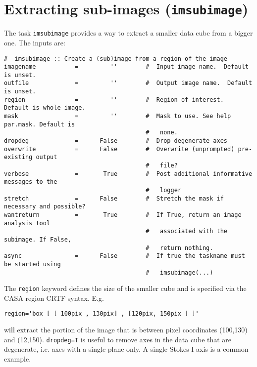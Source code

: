 \section{Extracting sub-images ({\tt imsubimage})}
\label{section:analysis.imsubimage}

The task {\tt imsubimage} provides a way to extract a smaller data
cube from a bigger one. The inputs are: 

\small
\begin{verbatim}
#  imsubimage :: Create a (sub)image from a region of the image
imagename           =         ''        #  Input image name.  Default is unset.
outfile             =         ''        #  Output image name.  Default is unset.
region              =         ''        #  Region of interest.  Default is whole image.
mask                =         ''        #  Mask to use. See help par.mask. Default is
                                        #   none.
dropdeg             =      False        #  Drop degenerate axes
overwrite           =      False        #  Overwrite (unprompted) pre-existing output
                                        #   file?
verbose             =       True        #  Post additional informative messages to the
                                        #   logger
stretch             =      False        #  Stretch the mask if necessary and possible?
wantreturn          =       True        #  If True, return an image analysis tool
                                        #   associated with the subimage. If False, 
                                        #   return nothing.
async               =      False        #  If true the taskname must be started using
                                        #   imsubimage(...)
\end{verbatim}
\normalsize 

The {\tt region} keyword defines the size of the smaller cube and is
specified via the CASA region CRTF syntax.  E.g.

\small
\begin{verbatim}
region='box [ [ 100pix , 130pix] , [120pix, 150pix ] ]'
\end{verbatim}
\normalsize

will extract the portion of the image that is between pixel
coordinates (100,130) and (12,150). {\tt dropdeg=T} is useful to remove
axes in the data cube that are degenerate, i.e. axes with a single
plane only. A single Stokes I axis is a common example.


